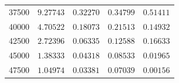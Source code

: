 \begin{table}[H]
\begin{minipage}[t]{0.48\linewidth}
\begin{tabular}{rrrrr}
             37500 & $9.27743$     & $0.32270$   & $0.34799$   & $0.51411$ \\
             40000 & $4.70522$     & $0.18073$   & $0.21513$   & $0.14932$ \\
             42500 & $2.72396$     & $0.06335$   & $0.12588$   & $0.16633$ \\
             45000 & $1.38333$     & $0.04318$   & $0.08533$   & $0.01965$ \\
             47500 & $1.04974$     & $0.03381$   & $0.07039$   & $0.00156$ \\
            \hline
        \end{tabular}
    \end{minipage}

    \vspace{0.3cm}


\end{table}
